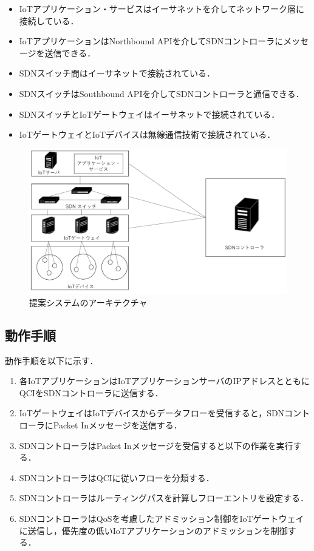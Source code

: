 \documentclass[a4paper,10pt,twocolumn,uplatex]{jsarticle}
\begin{document}
\begin{itemize}
  \item IoTアプリケーション・サービスはイーサネットを介してネットワーク層に接続している．
  \item IoTアプリケーションはNorthbound APIを介してSDNコントローラにメッセージを送信できる．
  \item SDNスイッチ間はイーサネットで接続されている．
  \item SDNスイッチはSouthbound APIを介してSDNコントローラと通信できる．
  \item SDNスイッチとIoTゲートウェイはイーサネットで接続されている．
  \item IoTゲートウェイとIoTデバイスは無線通信技術で接続されている．
\end{itemize}

\begin{figure}[!tb]
  \centering
  \includegraphics[width=\linewidth]{img/AQRA_Architecture.pdf}
  \caption{提案システムのアーキテクチャ}
  \label{fig:Architecture}
\end{figure}

\subsection{動作手順}
動作手順を以下に示す．

\begin{enumerate} %
  \item 各IoTアプリケーションはIoTアプリケーションサーバのIPアドレスとともにQCIをSDNコントローラに送信する．
  \item IoTゲートウェイはIoTデバイスからデータフローを受信すると，SDNコントローラにPacket Inメッセージを送信する．
  \item SDNコントローラはPacket Inメッセージを受信すると以下の作業を実行する．
  \item SDNコントローラはQCIに従いフローを分類する．
  \item SDNコントローラはルーティングパスを計算しフローエントリを設定する．
  \item SDNコントローラはQoSを考慮したアドミッション制御をIoTゲートウェイに送信し，優先度の低いIoTアプリケーションのアドミッションを制御する．
\end{enumerate}
\end{document}
